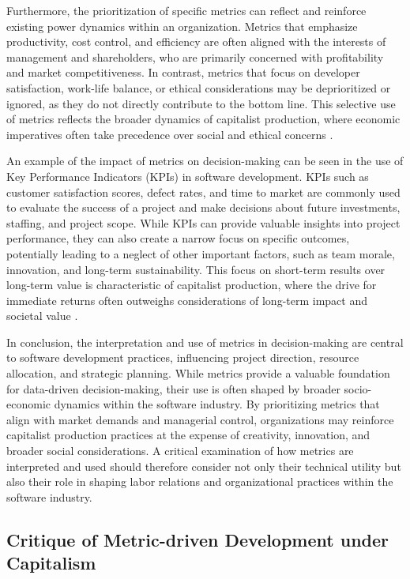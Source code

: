 \begin{refsection}
Furthermore, the prioritization of specific metrics can reflect and reinforce existing power dynamics within an organization. Metrics that emphasize productivity, cost control, and efficiency are often aligned with the interests of management and shareholders, who are primarily concerned with profitability and market competitiveness. In contrast, metrics that focus on developer satisfaction, work-life balance, or ethical considerations may be deprioritized or ignored, as they do not directly contribute to the bottom line. This selective use of metrics reflects the broader dynamics of capitalist production, where economic imperatives often take precedence over social and ethical concerns \cite[pp.~157-160]{Edwards1980ContestedTerrain}.

An example of the impact of metrics on decision-making can be seen in the use of Key Performance Indicators (KPIs) in software development. KPIs such as customer satisfaction scores, defect rates, and time to market are commonly used to evaluate the success of a project and make decisions about future investments, staffing, and project scope. While KPIs can provide valuable insights into project performance, they can also create a narrow focus on specific outcomes, potentially leading to a neglect of other important factors, such as team morale, innovation, and long-term sustainability. This focus on short-term results over long-term value is characteristic of capitalist production, where the drive for immediate returns often outweighs considerations of long-term impact and societal value \cite[pp.~45-48]{Harvey2007BriefHistory}.

In conclusion, the interpretation and use of metrics in decision-making are central to software development practices, influencing project direction, resource allocation, and strategic planning. While metrics provide a valuable foundation for data-driven decision-making, their use is often shaped by broader socio-economic dynamics within the software industry. By prioritizing metrics that align with market demands and managerial control, organizations may reinforce capitalist production practices at the expense of creativity, innovation, and broader social considerations. A critical examination of how metrics are interpreted and used should therefore consider not only their technical utility but also their role in shaping labor relations and organizational practices within the software industry.

\subsection{Critique of Metric-driven Development under Capitalism}


\end{refsection}
